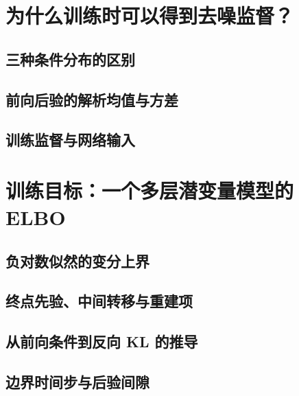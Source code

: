 \section{为什么训练时可以得到去噪监督？}
\label{sec:diffusion-supervision}
\contentplaceholder

\subsection{三种条件分布的区别}
\label{subsec:diffusion-conditionals}
\contentplaceholder

\subsection{前向后验的解析均值与方差}
\label{subsec:diffusion-posterior}
\contentplaceholder

\subsection{训练监督与网络输入}
\label{subsec:diffusion-inputs}
\contentplaceholder

\section{训练目标：一个多层潜变量模型的 ELBO}
\label{sec:diffusion-elbo}
\contentplaceholder

\subsection{负对数似然的变分上界}
\label{subsec:diffusion-bound}
\contentplaceholder

\subsection{终点先验、中间转移与重建项}
\label{subsec:diffusion-terms}
\contentplaceholder

\subsection{从前向条件到反向 KL 的推导}
\label{subsec:diffusion-derivation}
\contentplaceholder

\subsection{边界时间步与后验间隙}
\label{subsec:diffusion-endpoints}
\contentplaceholder

